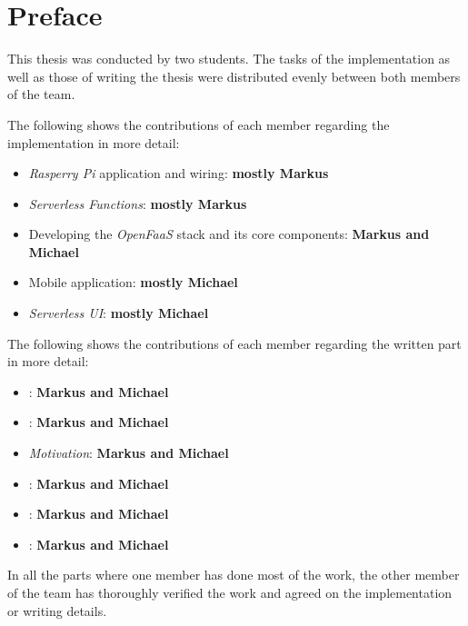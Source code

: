 \chapter*{Preface}

This thesis was conducted by two students. The tasks of the implementation as well as those of
writing the thesis were distributed evenly between both members of the team.

The following shows the contributions of each member regarding the implementation in more detail:

\begin{itemize}
  \setlength\itemsep{-1em}
  \item \textit{Rasperry Pi} application and wiring: \textbf{mostly Markus}
  \item \textit{Serverless Functions}: \textbf{mostly Markus}
  \item Developing the \textit{OpenFaaS} stack and its core components: \textbf{Markus and Michael}
  \item Mobile application: \textbf{mostly Michael}
  \item \textit{Serverless UI}: \textbf{mostly Michael}
\end{itemize}

The following shows the contributions of each member regarding the written part in more detail:

\begin{itemize}
  \setlength\itemsep{-1em}
  \item {} : \textbf{Markus and Michael}
  \item {} : \textbf{Markus and Michael}
  \item {}  \textit{Motivation}: \textbf{Markus and Michael}
  \item {} : \textbf{Markus and Michael}
  \item {} : \textbf{Markus and Michael}
  \item {} : \textbf{Markus and Michael}
\end{itemize}

In all the parts where one member has done most of the work, the other member of the team has
thoroughly verified the work and agreed on the implementation or writing details.
